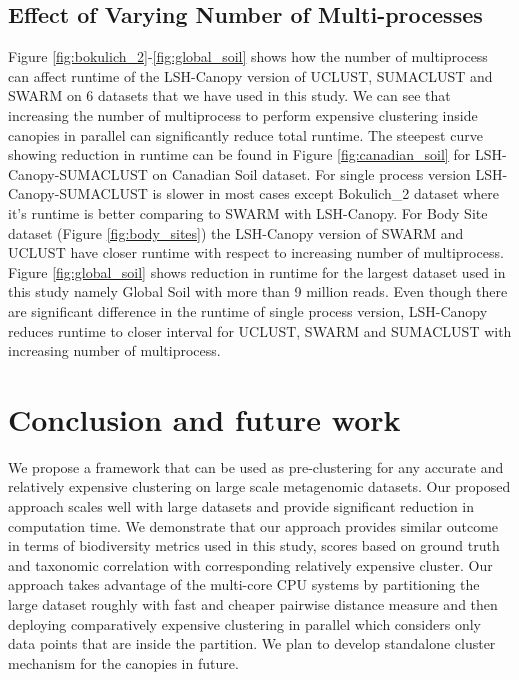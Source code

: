 \documentclass[10pt, conference, compsocconf]{IEEEtran}
\begin{document}
\subsection{\textbf{Effect of Varying Number of Multi-processes}}
Figure \ref{fig:bokulich_2}-\ref{fig:global_soil} shows how the number of multiprocess can affect runtime of the LSH-Canopy version of UCLUST, SUMACLUST and SWARM on 6 datasets that we have used in this study. We can see that increasing the number of multiprocess to perform expensive clustering inside canopies in parallel can significantly reduce total runtime. The steepest curve showing reduction in runtime can be found in Figure \ref{fig:canadian_soil} for LSH-Canopy-SUMACLUST on Canadian Soil dataset. For single process version LSH-Canopy-SUMACLUST is slower in most cases except Bokulich\_2 dataset where it's runtime is better comparing to SWARM with LSH-Canopy. For Body Site dataset (Figure \ref{fig:body_sites}) the LSH-Canopy version of SWARM and UCLUST have closer runtime with respect to increasing number of multiprocess. Figure \ref{fig:global_soil} shows reduction in runtime for the largest dataset used in this study namely Global Soil with more than 9 million reads. Even though there are significant difference in the runtime of single process version, LSH-Canopy reduces runtime to closer interval for UCLUST, SWARM and SUMACLUST with increasing number of multiprocess.                



\section{Conclusion and future work}

We propose a framework that can be used as pre-clustering for any accurate and relatively expensive clustering on large scale metagenomic datasets. Our proposed approach scales well with large datasets and provide significant reduction in computation time. We demonstrate that our approach provides similar outcome in terms of biodiversity metrics used in this study, scores based on ground truth and taxonomic correlation with corresponding relatively expensive cluster. Our approach takes advantage of the multi-core CPU systems by partitioning the large dataset roughly with fast and cheaper pairwise distance measure and then deploying comparatively expensive clustering in parallel which considers only data points that are inside the partition. We plan to develop standalone cluster mechanism for the canopies in future.   




\end{document}
